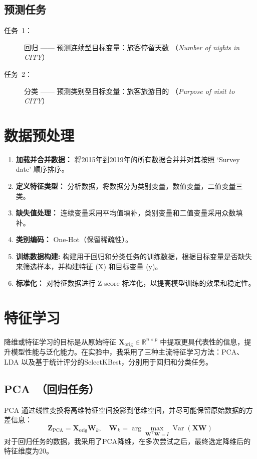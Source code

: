 \documentclass[10pt]{article}
\begin{document}
\subsection{预测任务}
\begin{description}
  \item[任务 1：] 回归 —— 预测连续型目标变量：旅客停留天数 （\emph{Number of nights in CITY}）
  \item[任务 2：] 分类 —— 预测类别型目标变量：旅客旅游目的 （\emph{Purpose of visit to CITY}）
\end{description}

\section{数据预处理}
\begin{enumerate}
  \item \textbf{加载并合并数据： } 将2015年到2019年的所有数据合并并对其按照 `Survey date' 顺序排序。
  \item \textbf{定义特征类型： }分析数据，将数据分为类别变量，数值变量，二值变量三类。
  \item \textbf{缺失值处理：} 连续变量采用平均值填补，类别变量和二值变量采用众数填补。
  \item \textbf{类别编码：} One‑Hot（保留稀疏性）。
  \item \textbf{训练数据构建: }  构建用于回归和分类任务的训练数据，根据目标变量是否缺失来筛选样本，并构建特征 (X) 和目标变量 (y)。
  \item \textbf{标准化：} 对特征数据进行 Z-score 标准化，以提高模型训练的效果和稳定性。
\end{enumerate}

\section{特征学习}

降维或特征学习的目标是从原始特征 $\mathbf{X}_{\text{orig}}\in\mathbb{R}^{n\times p}$ 中提取更具代表性的信息，提升模型性能与泛化能力。在实验中，我采用了三种主流特征学习方法：PCA、LDA 以及基于统计评分的SelectKBest，分别用于回归和分类任务。

\subsection{PCA （回归任务）}

PCA 通过线性变换将高维特征空间投影到低维空间，并尽可能保留原始数据的方差信息：
\[
  \mathbf{Z}_{\text{PCA}} = \mathbf{X}_{\text{orig}}\mathbf{W}_{k}, \quad
  \mathbf{W}_{k} = \arg\max \limits_{\mathbf{W}^\top\mathbf{W}=I}\operatorname{Var}(\mathbf{X}\mathbf{W})
\]
对于回归任务的数据，我采用了PCA降维，在多次尝试之后，最终选定降维后的特征维度为20。
\end{document}
